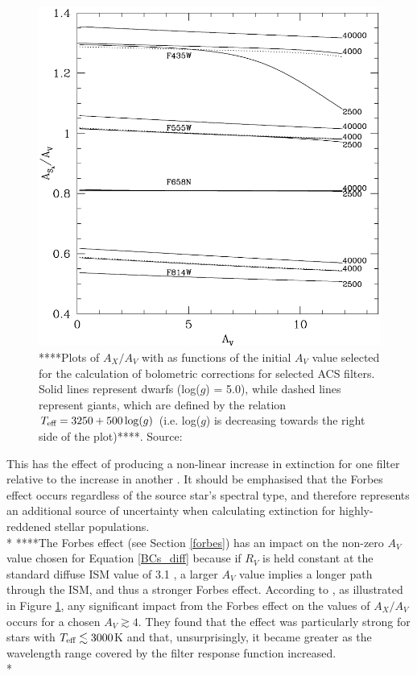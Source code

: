 \documentclass[12pt, a4paper]{report}
\begin{document}
\begin{figure}[h!]
\begin{center}
\includegraphics[width=1.0\textwidth]{girardi_forbes_effect_figure.png}
\caption{****Plots of $A_{X}/A_{V}$ with as functions of the initial $A_{V}$ value selected for the calculation of bolometric corrections for selected ACS filters. Solid lines represent dwarfs (log($g$) = 5.0), while dashed lines represent giants, which are defined by the relation $T_{\textnormal{eff}} = 3250 + 500\log(g)$ (i.e. log($g$) is decreasing towards the right side of the plot)****. Source: \cite{2008PASP..120..583G}}
\end{center}
\label{girardi_forbes}
\end{figure}

This has the effect of producing a non-linear increase in extinction for one filter relative to the increase in another \citep{1995A&AS..109..293G,2008PASP..120..583G}. It should be emphasised that the Forbes effect occurs regardless of the source star's spectral type, and therefore represents an additional source of uncertainty when calculating extinction for highly-reddened stellar populations. \\*
****The Forbes effect (see Section \ref{forbes}) has an impact on the non-zero $A_{V}$ value chosen for Equation \ref{BCs_diff} because if $R_{V}$ is held constant at the standard diffuse ISM value of 3.1 \citep{1989ApJ...345..245C}, a larger $A_{V}$ value implies a longer path through the ISM, and thus a stronger Forbes effect. According to \cite{2008PASP..120..583G}, as illustrated in Figure \ref{girardi_forbes}, any significant impact from the Forbes effect on the values of $A_{X}/A_{V}$ occurs for a chosen $A_{V} \gtrsim 4$. They found that the effect was particularly strong for stars with $T_{\textnormal{eff}} \lesssim 3000$K and that, unsurprisingly, it became greater as the wavelength range covered by the filter response function increased.\\*
\end{document}
